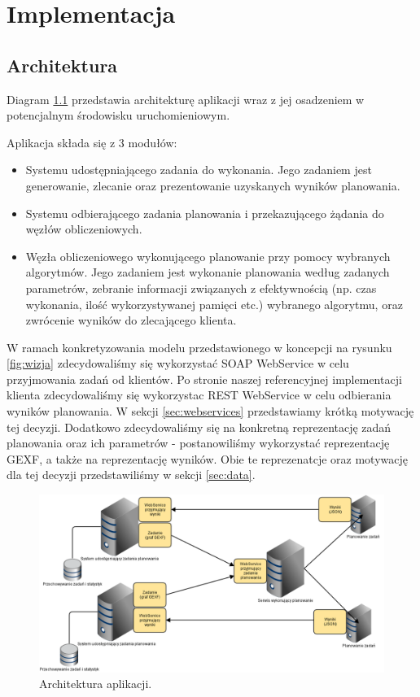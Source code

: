 \chapter{Implementacja}

\section{Architektura}

Diagram \ref{fig:architektura} przedstawia architekturę aplikacji wraz z jej osadzeniem w potencjalnym środowisku uruchomieniowym.

Aplikacja składa się z 3 modułów:

\begin{itemize}
	\item Systemu udostępniającego zadania do wykonania. 
	Jego zadaniem jest generowanie, zlecanie oraz prezentowanie uzyskanych wyników planowania.
	\item Systemu odbierającego zadania planowania i przekazującego żądania do węzłów obliczeniowych.
	\item Węzła obliczeniowego wykonującego planowanie przy pomocy wybranych algorytmów. 
	Jego zadaniem jest wykonanie planowania według zadanych parametrów, zebranie informacji związanych z efektywnością (np. czas wykonania, ilość wykorzystywanej pamięci etc.) wybranego algorytmu, oraz zwrócenie wyników do zlecającego klienta.
\end{itemize}

W ramach konkretyzowania modelu przedstawionego w koncepcji na rysunku \ref{fig:wizja} zdecydowaliśmy się wykorzystać SOAP WebService w celu przyjmowania zadań od klientów.
Po stronie naszej referencyjnej implementacji klienta zdecydowaliśmy się wykorzystac REST WebService w celu odbierania wyników planowania.
W sekcji \ref{sec:webservices} przedstawiamy krótką motywację tej decyzji.
Dodatkowo zdecydowaliśmy się na konkretną reprezentację zadań planowania oraz ich parametrów - postanowiliśmy wykorzystać reprezentację GEXF, a także na reprezentację wyników.
Obie te reprezenatcje oraz motywację dla tej decyzji przedstawiliśmy w sekcji \ref{sec:data}.

\begin{figure}
	\centering
	\includegraphics[width=\linewidth]{img/architektura}
	\caption{Architektura aplikacji.}
	\label{fig:architektura}
\end{figure}

